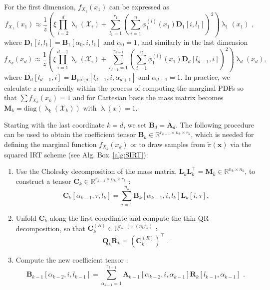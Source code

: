 For the first dimension, $f_{X_1}(x_1)$ can be expressed as \cite[Eq.~30]{cui2022deep}
\begin{equation}
	f_{X_1}(x_1)  \approx \frac{1}{z} \left(\xi \prod_{i=2}^{d} \uplambda_i(\mathcal{X}_i) + \sum_{l_1=1}^{r_1} \left(\sum_{i=1}^{n} \phi^{(i)}_1(x_1) \bm{D}_1[i, l_1] \right)^2 \right) \uplambda_1(x_1)\, \, ,
	\label{eq:firstMarg}
\end{equation}
where $\bm{D}_1[i, l_1] = \bm{B}_1[\alpha_0, i, l_1]$ and $\alpha_0 = 1$,
and similarly in the last dimension
\begin{equation}
	f_{X_d}(x_d)  \approx \frac{1}{z} \left(\xi \prod_{i=1}^{d-1} \uplambda_i(\mathcal{X}_i) + \sum_{l_{d-1}=1}^{r_{d-1}} \left(\sum_{i=1}^{n} \phi^{(i)}_1(x_1) \bm{D}_d[l_{d-1},i] \right)^2 \right) \uplambda_d(x_d), 	\label{eq:lastMarg}
\end{equation}
where $\bm{D}_d[l_{d-1},i] = \bm{B}_{\text{pre},d}[l_{d-1}, i, \alpha_{d+1}]$ and $\alpha_{d+1} = 1$.
In practice, we calculate $z$ numerically within the process of computing the marginal PDFs so that $\sum f_{X_k}(x_k) =1 $ and for Cartesian basis the mass matrix becomes $\bm{M}_k = \text{diag}(\uplambda_k(\mathcal{X}_k))$ with $\uplambda(x) = 1$.
\clearpage
\begin{prop}
	\label{prob:backMarg}
	Starting with the last coordinate $k = d$, we set $\bm{B}_d = \bm{A}_d$. The following procedure can be used to obtain the coefficient tensor $\bm{B}_{k} \in \mathbb{R}^{r_{k-1} \times n_{k} \times r_{k}}$, which is needed for defining the marginal function $f_{X_k}(x_k)$ or to draw samples from $\tilde{\pi}(\bm{x})$ via the squared IRT scheme (see Alg. Box~\ref{alg:SIRT}):
	\begin{enumerate}
		\item Use the Cholesky decomposition of the mass matrix, $\bm{L}_k \bm{L}_k^\top = \bm{M}_k \in \mathbb{R}^{n_k \times n_k}$, to construct a tensor $\bm{C}_k \in \mathbb{R}^{r_{k-1} \times n_k \times r_k}$ \cite[Eq.~27]{cui2022deep}:
		\begin{equation}
			\bm{C}_k[\alpha_{k-1}, \tau, l_k] = \sum_{i=1}^{n_k} \bm{B}_k[\alpha_{k-1}, i, l_k] \bm{L}_k[i, \tau]  \label{eq:constrCBack}.
		\end{equation}
		\item Unfold $\bm{C}_k$ along the first coordinate and compute the thin QR decomposition, so that $\bm{C}_k^{(R)} \in \mathbb{R}^{r_{k-1} \times (n_k r_k)}$  \cite[Eq.~28]{cui2022deep}:
		\begin{equation}
			\bm{Q}_k \bm{R}_k = {(\bm{C}_k^{(R)})}^{\top} \, \, .\label{eq:thinQRBack}
		\end{equation}
		\item Compute the new coefficient tensor \cite[Eq.~29]{cui2022deep}:
		\begin{equation}
			\bm{B}_{k-1}[\alpha_{k-2}, i, l_{k-1}] = \sum_{\alpha_{k-1}=1}^{r_{k-1}} \bm{A}_{k-1}[\alpha_{k-2}, i, \alpha_{k-1}] \bm{R}_k[l_{k-1}, \alpha_{k-1}]\, \,   \label{eq:nextCoeffTBack}.
		\end{equation}
	\end{enumerate}
\end{prop}
